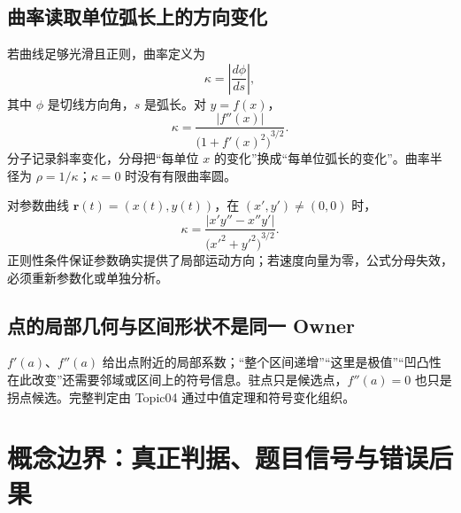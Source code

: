 \documentclass[11pt,a4paper]{ctexart}
\begin{document}
\subsection{曲率读取单位弧长上的方向变化}

若曲线足够光滑且正则，曲率定义为
\[
\kappa=\left|\frac{d\phi}{ds}\right|,
\]
其中 $\phi$ 是切线方向角，$s$ 是弧长。对 $y=f(x)$，
\[
\boxed{\kappa=\frac{|f''(x)|}{{\bigl(1+{f'(x)}^2\bigr)}^{3/2}}}.
\]
分子记录斜率变化，分母把“每单位 $x$ 的变化”换成“每单位弧长的变化”。曲率半径为 $\rho=1/\kappa$；$\kappa=0$ 时没有有限曲率圆。

对参数曲线 $\bm r(t)=(x(t),y(t))$，在 $(x',y')\ne(0,0)$ 时，
\[
\kappa=
\frac{|x'y''-x''y'|}{{\bigl({x'}^2+{y'}^2\bigr)}^{3/2}}.
\]
正则性条件保证参数确实提供了局部运动方向；若速度向量为零，公式分母失效，必须重新参数化或单独分析。

\subsection{点的局部几何与区间形状不是同一 Owner}

$f'(a)$、$f''(a)$ 给出点附近的局部系数；“整个区间递增”“这里是极值”“凹凸性在此改变”还需要邻域或区间上的符号信息。驻点只是候选点，$f''(a)=0$ 也只是拐点候选。完整判定由 Topic04 通过中值定理和符号变化组织。

\section{概念边界：真正判据、题目信号与错误后果}
\end{document}

